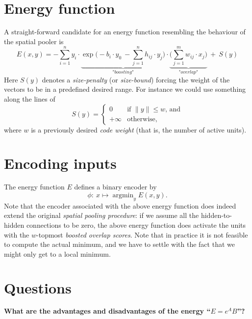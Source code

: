 \documentclass[titlepage]{amsart}
\theoremstyle{definition}
\begin{document}
\section{Energy function}
% 
% 
A straight-forward candidate for an energy function resembling the behaviour of 
the spatial pooler is
$$
  E(x,y) = - \sum_{i=1}^n 
        y_i 
        \cdot
        \underbrace{
        \exp\Big( - b_i\cdot y_0 \ -  \sum_{j=1}^n h_{ij} \cdot y_j \Big)
        }_{\textit{"boosting"}}
        \cdot
        \underbrace{
        \Big(\sum_{j=1}^m w_{ij}\cdot x_j \Big)  
        }_{\textit{"overlap"}}
        \ + \  
        S(y)
$$
Here $S(y)$ denotes a \textit{size-penalty} (or \textit{size-bound}) forcing 
the weight of the vectors to be in a predefined desired range. 
For instance we could use something along the lines of
$$
    S(y) = 
    \begin{cases}
            0  &  \text{if $\|y\| \leq w$, and} \\
      +\infty  &  \text{otherwise,}
    \end{cases}
$$
where $w$ is a previously desired \textit{code weight} (that is, the number of active units).
% 
% 
\section{Encoding inputs}
% 
% 
The energy function $E$ defines a binary encoder by
$$
    \phi\colon \  x \mapsto \mathop{\arg\min}_y E(x,y).
$$
Note that the encoder associated with the above energy function does indeed 
extend the original \textit{spatial pooling procedure}: if we assume all the 
hidden-to-hidden connections to be zero, the above energy function does activate 
the units with the $w$-topmost \textit{boosted overlap scores}.
Note that in practice it is not feasible to compute the actual minimum, 
and we have to settle with the fact that we might only get to a local minimum.
% 
% 
\section{Questions}
% 
% 
\noindent\textbf{What are the advantages and disadvantages of the energy ``$E=e^A B$''?}
\parskip 5pt
\end{document}
